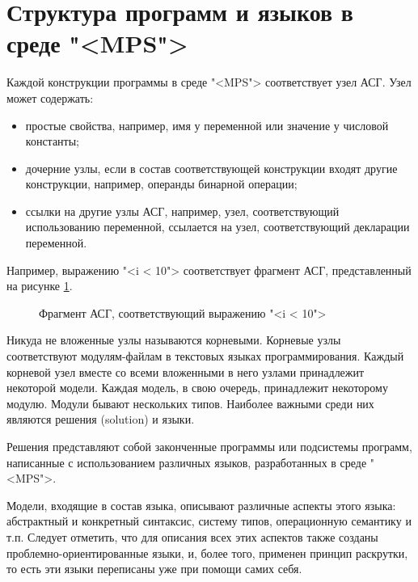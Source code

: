 \section{Структура программ и языков в среде "<MPS">}
Каждой конструкции программы в среде "<MPS"> соответствует узел АСГ. Узел может содержать:
\begin{itemize}
 \item простые свойства, например, имя у переменной или значение у числовой константы;
 \item дочерние узлы, если в состав соответствующей конструкции входят другие конструкции, например, операнды бинарной операции;
 \item ссылки на другие узлы АСГ, например, узел, соответствующий использованию переменной, ссылается на узел, соответствующий декларации переменной.
\end{itemize}

Например, выражению "<i < 10"> соответствует фрагмент АСГ, представленный на рисунке \ref{fig:Less}.
\begin{figure}
 \centering
 \caption{Фрагмент АСГ, соответствующий выражению "<i < 10">}
 \label{fig:Less}
\end{figure}

Никуда не вложенные узлы называются корневыми. Корневые узлы соответствуют модулям-файлам в текстовых языках программирования. Каждый корневой узел вместе со всеми вложенными в него узлами принадлежит некоторой модели. Каждая модель, в свою очередь, принадлежит некоторому модулю. Модули бывают нескольких типов. Наиболее важными среди них являются решения (solution) и языки.

Решения представляют собой законченные программы или подсистемы программ, написанные с использованием различных языков, разработанных в среде "<MPS">.

Модели, входящие в состав языка, описывают различные аспекты этого языка: абстрактный и конкретный синтаксис, систему типов, операционную семантику и т.п. Следует отметить, что для описания всех этих аспектов также созданы проблемно-ориентированные языки, и, более того, применен принцип раскрутки, то есть эти языки переписаны уже при помощи самих себя.

